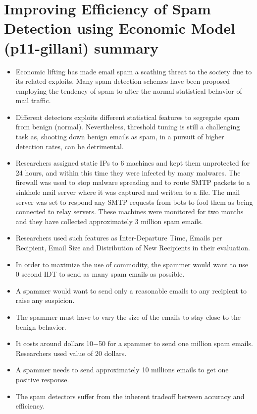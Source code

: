 \documentclass[14pt]{article}
\begin{document}
	\section{Improving Efﬁciency of Spam Detection using Economic Model (p11-gillani) summary}
	\begin{itemize}
	\item Economic lifting has made email spam a scathing threat to the society due to its related exploits. Many spam detection schemes have been proposed employing the tendency of spam to alter the normal statistical behavior of mail traﬃc. 
	\item  Diﬀerent detectors exploits diﬀerent statistical features to segregate spam from benign (normal). Nevertheless, threshold tuning is still a challenging task as, shooting down benign emails as spam, in a pursuit of higher detection rates, can be detrimental.
	\item Researchers assigned static IPs to 6 machines and kept them unprotected for 24 hours, and within this time they were infected by many malwares. The ﬁrewall was used to stop malware spreading and to route SMTP packets to a sinkhole mail server where it was captured and written to a ﬁle. The mail server was set to respond any SMTP requests from bots to fool them as being connected to relay servers. These machines were monitored for two months and they have collected approximately 3 million spam emails.
	\item Researchers used such features as Inter-Departure Time, Emails per Recipient, Email Size and Distribution of New Recipients in their evaluation.
	\item In order to maximize the use of commodity, the spammer would want to use 0 second IDT to send as many spam emails as possible. 
	\item A spammer would want to send only a reasonable emails to any recipient to raise any suspicion.
	\item The spammer must have to vary the size of the emails to stay close to the benign behavior.
	\item It costs around dollars 10−50 for a spammer to send one million spam emails. Researchers used value of 20 dollars.
	\item A spammer needs to send approximately 10 millions emails to get one positive response.
	\item The spam detectors suﬀer from the inherent tradeoﬀ between accuracy and eﬃciency. 
	\end{itemize}
\end{document}
